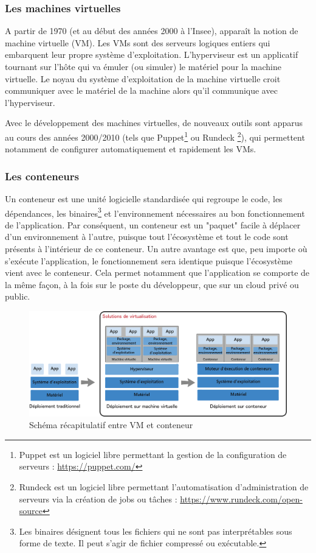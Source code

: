 \documentclass[11pt,fleqn]{book} %
\begin{document}
\subsubsection{Les machines virtuelles}
A partir de 1970 (et au début des années 2000 à l'Insee), apparaît  la notion de machine virtuelle (VM). Les VMs sont des serveurs logiques entiers qui embarquent leur propre système d’exploitation. L’hyperviseur est un applicatif tournant sur l’hôte qui va émuler (ou simuler) le matériel pour la machine virtuelle. Le noyau du système d’exploitation de la machine virtuelle croit communiquer avec le matériel de la machine alors qu’il communique avec l’hyperviseur.

Avec le développement des machines virtuelles, de nouveaux outils sont apparus au cours des années 2000/2010 (tels que Puppet\footnote{Puppet est un logiciel libre permettant la gestion de la configuration de serveurs : \url{https://puppet.com/}} ou Rundeck \footnote{Rundeck est un logiciel libre permettant l'automatisation d'administration de serveurs via la création de jobs ou tâches : \url{https://www.rundeck.com/open-source}}), qui permettent notamment de configurer automatiquement et rapidement les VMs.


\subsubsection{Les conteneurs}
Un conteneur est une unité logicielle standardisée qui regroupe le code, les dépendances, les binaires\footnote{Les binaires désignent tous les fichiers qui ne sont pas interprétables sous forme de texte. Il peut s'agir de fichier compressé ou exécutable.} et l'environnement nécessaires au bon fonctionnement de l'application. Par conséquent, un conteneur est un "paquet" facile à déplacer d'un environnement à l'autre, puisque tout l'écosystème et tout le code sont présents à l'intérieur de ce conteneur. Un autre avantage est que, peu importe où s'exécute l'application, le fonctionnement sera identique puisque l'écosystème vient avec le conteneur. Cela permet notamment que l'application se comporte de la même façon, à la fois sur le poste du développeur, que sur un cloud privé ou public. \\




\begin{figure}[H]
\renewcommand{\figurename}{Schéma}
\hspace{-1cm}
\includegraphics[scale=0.7]{Pictures/container_evolution.png}
\captionsetup{margin=1.5cm,format=hang,justification=justified}
\caption[]{Schéma récapitulatif entre VM et conteneur \newline}
\end{figure}
\end{document}
